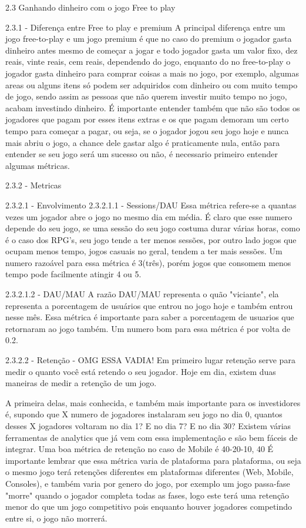 2.3 Ganhando dinheiro com o jogo Free to play

2.3.1 - Diferença entre Free to play e premium
A principal diferença entre um jogo free-to-play e um jogo premium é que no caso do premium o jogador gasta dinheiro antes mesmo de começar a jogar e todo jogador gasta um valor fixo, dez reais, vinte reais, cem reais, dependendo do jogo, enquanto do no free-to-play o jogador gasta dinheiro para comprar coisas a mais no jogo, por exemplo, algumas areas ou alguns itens só podem ser adquiridos com dinheiro ou com muito tempo de jogo, sendo assim as pessoas que não querem investir muito tempo no jogo, acabam investindo dinheiro. É importante entender também que não são todos os jogadores que pagam por esses itens extras e os que pagam demoram um certo tempo para começar a pagar, ou seja, se o jogador jogou seu jogo hoje e nunca mais abriu o jogo, a chance dele gastar algo é praticamente nula, então para entender se seu jogo será um sucesso ou não, é necessario primeiro entender algumas métricas.

2.3.2 - Metricas

2.3.2.1 - Envolvimento
2.3.2.1.1 - Sessions/DAU
Essa métrica refere-se a quantas vezes um jogador abre o jogo no mesmo dia em média. É claro que esse numero depende do seu jogo, se uma sessão do seu jogo costuma durar várias horas, como é o caso dos RPG's, seu jogo tende a ter menos sessões, por outro lado jogos que ocupam menos tempo, jogos casuais no geral, tendem a ter mais sessões. Um numero razoável para essa métrica é 3(três), porém jogos que consomem menos tempo pode facilmente atingir 4 ou 5.

2.3.2.1.2 - DAU/MAU
A razão DAU/MAU representa o quão "viciante", ela representa a porcentagem de usuários que entrou no jogo hoje e também entrou nesse mês. Essa métrica é importante para saber a porcentagem de usuarios que retornaram ao jogo também. Um numero bom para essa métrica é por volta de 0.2.

2.3.2.2 - Retenção - OMG ESSA VADIA!
Em primeiro lugar retenção serve para medir o quanto você está retendo o seu jogador. Hoje em dia, existem duas maneiras de medir a retenção de um jogo.

A primeira delas, mais conhecida, e também mais importante para os investidores é, supondo que X numero de jogadores instalaram seu jogo no dia 0, quantos desses X jogadores voltaram no dia 1? E no dia 7? E no dia 30? Existem várias ferramentas de analytics que já vem com essa implementação e são bem fáceis de integrar.
Uma boa métrica de retenção no caso de Mobile é 40-20-10, 40%
É importante lembrar que essa métrica varia de plataforma para plataforma, ou seja o mesmo jogo terá retenções diferentes em plataformas diferentes (Web, Mobile, Consoles), e também varia por genero do jogo, por exemplo um jogo passa-fase "morre" quando o jogador completa todas as fases, logo este terá uma retenção menor do que um jogo competitivo pois enquanto houver jogadores competindo entre si, o jogo não morrerá.


